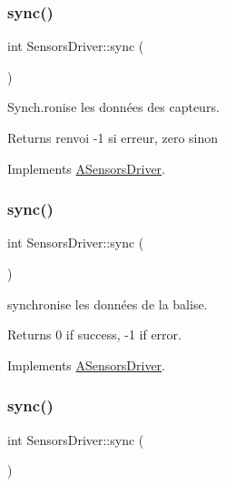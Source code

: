 \subsubsection{\texorpdfstring{sync()}{sync()}\hspace{0.1cm}{\footnotesize\ttfamily [2/4]}}
{\footnotesize\ttfamily int Sensors\+Driver\+::sync (\begin{DoxyParamCaption}{ }\end{DoxyParamCaption})\hspace{0.3cm}{\ttfamily [virtual]}}



Synch.\+ronise les données des capteurs. 

\begin{DoxyReturn}{Returns}
renvoi -\/1 si erreur, zero sinon 
\end{DoxyReturn}


Implements \hyperlink{classASensorsDriver_a0c581029ba10d5ac820a9e3e2e6883cd}{A\+Sensors\+Driver}.

\mbox{\label{classSensorsDriver_a1bfbcc82461257094ed185fa2017afad}} 
\subsubsection{\texorpdfstring{sync()}{sync()}\hspace{0.1cm}{\footnotesize\ttfamily [3/4]}}
{\footnotesize\ttfamily int Sensors\+Driver\+::sync (\begin{DoxyParamCaption}{ }\end{DoxyParamCaption})\hspace{0.3cm}{\ttfamily [virtual]}}



synchronise les données de la balise. 

\begin{DoxyReturn}{Returns}
0 if success, -\/1 if error. 
\end{DoxyReturn}


Implements \hyperlink{classASensorsDriver_a0c581029ba10d5ac820a9e3e2e6883cd}{A\+Sensors\+Driver}.

\mbox{\label{classSensorsDriver_a1bfbcc82461257094ed185fa2017afad}} 
\subsubsection{\texorpdfstring{sync()}{sync()}\hspace{0.1cm}{\footnotesize\ttfamily [4/4]}}
{\footnotesize\ttfamily int Sensors\+Driver\+::sync (\begin{DoxyParamCaption}{ }\end{DoxyParamCaption})\hspace{0.3cm}{\ttfamily [virtual]}}



